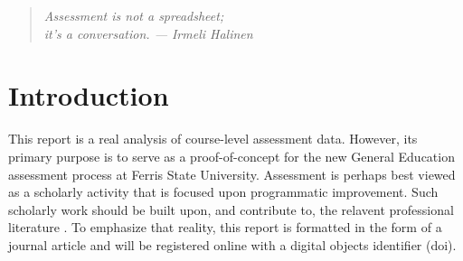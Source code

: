 \documentclass[fleqn,10pt]{SelfArx}\usepackage[]{graphicx}\usepackage[]{color}
\affiliation{\textsuperscript{1}\textit{General Education Coordinator, Ferris State University}} %
\begin{document}
\flushbottom %

\maketitle %

\tableofcontents %

{
	\fancyhf{}
}
\thispagestyle{firststyle}











\begin{quote}
\begin{center}
\textit{Assessment is not a spreadsheet; \\ it's a conversation. --- Irmeli Halinen}
\end{center}
\end{quote}

\section{Introduction} %

This report is a real analysis of course-level assessment data. However, its primary purpose is to serve as a proof-of-concept for the new General Education assessment process at Ferris State University. Assessment is perhaps best viewed as a scholarly activity that is focused upon programmatic improvement. Such scholarly work should be built upon, and contribute to, the relavent professional literature \citep{Weimer2015}. To emphasize that reality, this report is formatted in the form of a journal article and will be registered online with a digital objects identifier (doi).
\end{document}
